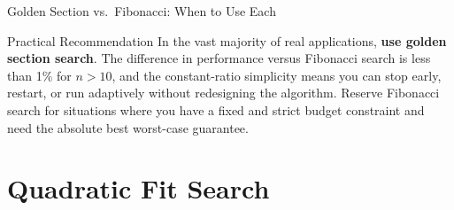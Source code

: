 \documentclass[aspectratio=169,10pt]{beamer}
\begin{document}
\begin{frame}[allowframebreaks]{Golden Section vs.\ Fibonacci: When to Use Each}
  \begin{alertblock}{Practical Recommendation}
    In the vast majority of real applications, \textbf{use golden section
    search}.  The difference in performance versus Fibonacci search is less
    than 1\% for $n > 10$, and the constant-ratio simplicity means you can
    stop early, restart, or run adaptively without redesigning the algorithm.
    Reserve Fibonacci search for situations where you have a fixed and strict
    budget constraint and need the absolute best worst-case guarantee.
  \end{alertblock}

\end{frame}

\section{Quadratic Fit Search}
\end{document}
